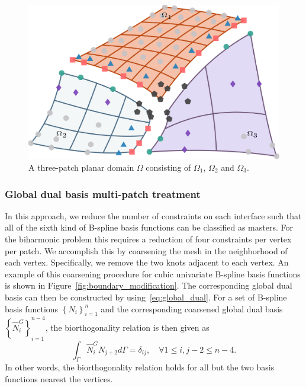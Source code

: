 \begin{figure}[ht]
  \center
  \includegraphics[scale=.4]{three-patch-mesh_backup}
  \caption{A three-patch planar domain $\Omega$ consisting of $\Omega_1$, $\Omega_2$ and $\Omega_3$.}
  \label{fig:three-patch-mesh}
\end{figure}

\subsubsection{Global dual basis multi-patch treatment}\label{sec:vertex_modification}
In this approach, we reduce the number of constraints on each interface such that all of the sixth kind of B-spline basis functions can be classified as masters. For the biharmonic problem this requires a reduction of four constraints per vertex per patch. We accomplish this by coarsening the mesh in the neighborhood of each vertex. Specifically, we remove the two knots adjacent to each vertex. An example of this coarsening procedure for cubic univariate B-spline basis functions is shown in Figure~\ref{fig:boundary_modification}. The corresponding global dual basis can then be constructed by using~\eqref{eq:global_dual}. For a set of B-spline basis functions $\left\{N_i\right\}_{i=1}^n$ and the corresponding coarsened global dual basis $\left\{\hat{N}^G_i\right\}_{i=1}^{n-4}$, the biorthogonality relation is then given as
\begin{equation}
  \int_\Gamma \hat{N}^G_iN_{j+2} d\Gamma = \delta_{ij}, \quad \forall 1\leq i,j-2\leq n-4.\label{eq:modify_biorthogonality}
\end{equation}
In other words, the biorthogonality relation holds for all but the two basis functions nearest the vertices.\par


